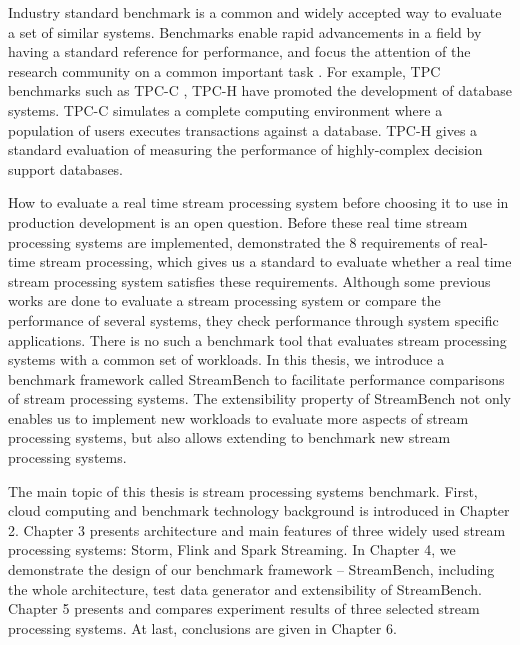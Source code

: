 Industry standard benchmark is a common and widely accepted way to evaluate a set of similar systems. Benchmarks enable rapid advancements in a field by having a standard reference for performance, and focus the attention of the research community on a common important task \cite{patterson2012better}. For example, TPC benchmarks such as TPC-C \cite{TPC-C}, TPC-H \cite{TPC-H} have promoted the development of database systems. TPC-C simulates a complete computing environment where a population of users executes transactions against a database. TPC-H gives a standard evaluation of measuring the performance of highly-complex decision support databases.

How to evaluate a real time stream processing system before choosing it to use in production development is an open question.  Before these real time stream processing systems are implemented, \citeauthor{8requirements} demonstrated the 8 requirements\cite{8requirements} of real-time stream processing, which gives us a standard to evaluate whether a real time stream processing system satisfies these requirements.
Although some previous works \cite{cordovaanalysis, xinhstechblog, samza-benchmark, manoj-sotrm-vs-spark,flink-latency} are done to evaluate a stream processing system or compare the performance of several systems, they check performance through system specific applications. There is no such a benchmark tool that evaluates stream processing systems with a common set of workloads. In this thesis, we introduce a benchmark framework called StreamBench to facilitate performance comparisons of stream processing systems. The extensibility property of StreamBench not only enables us to implement new workloads to evaluate more aspects of stream processing systems, but also allows extending to benchmark new stream processing systems.

The main topic of this thesis is stream processing systems benchmark. First, cloud computing and benchmark technology background is introduced in Chapter 2. Chapter 3 presents architecture and main features of three widely used stream processing systems: Storm, Flink and Spark Streaming. In Chapter 4, we demonstrate the design of our benchmark framework -- StreamBench, including the whole architecture, test data generator and extensibility of StreamBench. Chapter 5 presents and compares experiment results of three selected stream processing systems. At last, conclusions are given in Chapter 6.

\clearpage

